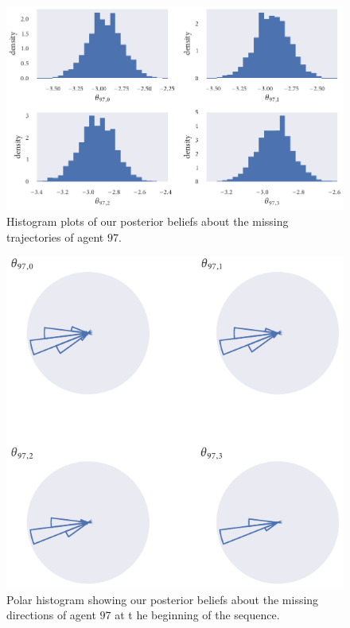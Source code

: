 \begin{figure}[!tbp]
	\includegraphics{output/seq05_hist_beg_miss_i=97.pdf}
	\caption{Histogram plots of our posterior beliefs about the missing trajectories of agent $97$.}
	\label{fig:seq05_hist_beg_miss_i=97}
\end{figure}
\begin{figure}[!tbp]
	\includegraphics{output/seq05_polar_hist_beg_miss_i=97.pdf}
	\caption{Polar histogram showing our posterior beliefs about the missing directions of agent $97$ at t
he beginning of the sequence.}
	\label{fig:seq05_polar_hist_beg_miss_i=97}
\end{figure}

